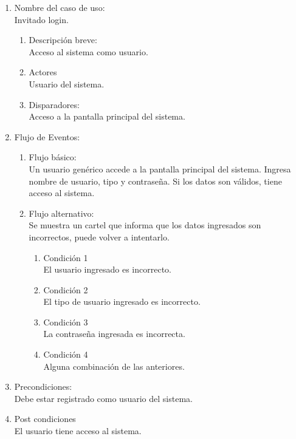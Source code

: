 \documentclass[a4paper,11pt]{article}
\begin{document}
\begin{enumerate}

	\item Nombre del caso de uso: \\
	Invitado login.

	\begin{enumerate}
		\item Descripción breve: \\
			Acceso al sistema como usuario.
		\item Actores \\
			Usuario del sistema.
	
		\item Disparadores: \\
			Acceso a la pantalla principal del sistema.

	\end{enumerate}

	\item Flujo de Eventos: \\

	\begin{enumerate}
		\item Flujo básico:\\
			Un usuario gen\'erico accede a la pantalla principal del sistema.
			Ingresa nombre de usuario, tipo y contrase\~na. Si los datos son
			v\'alidos, tiene acceso al sistema.

		\item Flujo alternativo:\\
			Se muestra un cartel que informa que los datos ingresados son
			incorrectos, puede volver a intentarlo.

			\begin{enumerate}
			\item Condición 1 \\
				El usuario ingresado es incorrecto.
			\item Condición 2 \\
				El tipo de usuario ingresado es incorrecto.
			\item Condición 3 \\
				La contrase\~na ingresada es incorrecta.
			\item Condición 4 \\
				Alguna combinaci\'on de las anteriores.
			\end{enumerate}

	\end{enumerate}

	\item Precondiciones: \\
		Debe estar registrado como usuario del sistema.

	\item Post condiciones \\
		El usuario tiene acceso al sistema.

\end{enumerate}
\end{document}
